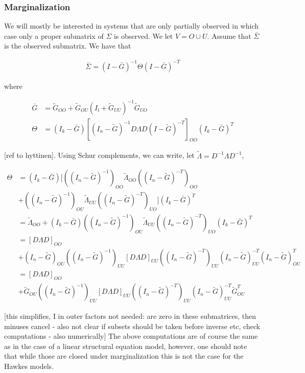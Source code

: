 \documentclass[accepted]{uai2021} %
\begin{document}
\subsubsection{Marginalization}

We will mostly be interested in systems that are only partially observed in 
which case only a proper submatrix of $\Sigma$ is observed. We let $V = O \cup 
U$. Assume that $\bar{\Sigma}$ is the observed submatrix. We have 
that 

\begin{align}
\bar{\Sigma} = (I - \bar{G})^{-1}\Theta(I - \bar{G})^{-T}
\end{align}

where 

\begin{align*}
\bar{G} & = \tilde{G}_{OO} +  \tilde{G}_{OU}(I_l + 
\tilde{G}_{UU})^{-1}\tilde{G}_{UO} \\
\Theta & = (I_k-\bar{G})[(I_n - \tilde{G})^{-1}D\Lambda D(I - 
\tilde{G})^{-T}]_{OO}(I_k-\bar{G})^T
\end{align*}

[ref to hyttinen]. Using Schur complements, we can write, let $\tilde{\Lambda} 
= D^{-1}\Lambda D^{-1}$,

\begin{align*}
\Theta & = (I_k - \bar{G})[((I_n - 
\tilde{G})^{-1})_{OO}\tilde{\Lambda}_{OO}((I_n - \tilde{G})^{-T})_{OO} \\ & + 
((I_n 
- 
\tilde{G})^{-1})_{OU}\tilde{\Lambda}_{UU}((I_n - \tilde{G})^{-T})_{UO}](I_k - 
\bar{G})^T \\
& = \tilde{\Lambda}_{OO} + (I_k - \bar{G})((I_n 
- 
\tilde{G})^{-1})_{OU}\tilde{\Lambda}_{UU}((I_n - \tilde{G})^{-T})_{UO}(I_k - 
\bar{G})^T \\
& = [D\Lambda D]_{OO} \\ & + (I_n - \tilde{G})_{OU}((I_n - 
\tilde{G})^{-1})_{UU}[D\Lambda D]_{UU}((I_n - \tilde{G})^{-T})_{UU}(I_n - 
\tilde{G})_{UU}^{-T}(I_n - 
\tilde{G})_{OU}^T \\
& = [D\Lambda D]_{OO} \\ & + \tilde{G}_{OU}((I_n - 
\tilde{G})^{-1})_{UU}[D\Lambda D]_{UU}((I_n - \tilde{G})^{-T})_{UU}(I_n - 
\tilde{G})_{UU}^{-T} 
\tilde{G}_{OU}^T
\end{align*}

[this simplifies, I in outer factors not needed: are zero in these submatrices, 
then minuses cancel - also not clear if subsets should be taken before inverse 
etc, check computations - also numerically]
The above computations are of course the same as in the case of a linear 
structural equation model, however, one should note that while those are closed 
under marginalization this is not the case for the Hawkes models.
\end{document}
